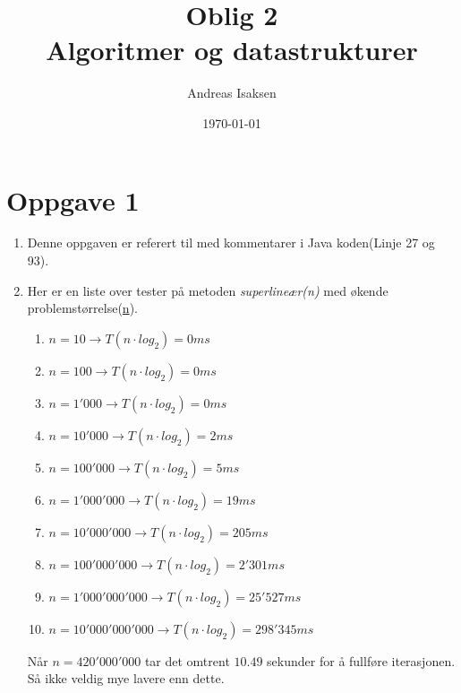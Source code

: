 \documentclass{article}
\begin{document}
  

\title{Oblig 2\\Algoritmer og datastrukturer}
\author{Andreas Isaksen}  
\date{\today}  
\maketitle  
\pagebreak

\section*{Oppgave 1}
\begin{enumerate}[label=\alph*)]
\item Denne oppgaven er referert til med kommentarer i Java koden(Linje 27 og 93).
\item Her er en liste over tester på metoden \textit{superlineær(n)} med økende problemstørrelse(\underline{n}).
\begin{enumerate}[label=-]
\item $n = 10 \to T(n\cdot log_2) = 0ms$
\item $n = 100 \to T(n\cdot log_2) = 0ms$
\item $n = 1'000 \to T(n\cdot log_2) = 0ms$
\item $n = 10'000 \to T(n\cdot log_2) = 2ms$
\item $n = 100'000 \to T(n\cdot log_2) = 5ms$
\item $n = 1'000'000 \to T(n\cdot log_2) = 19ms$
\item $n = 10'000'000 \to T(n\cdot log_2) = 205ms$
\item $n = 100'000'000 \to T(n\cdot log_2) = 2'301ms$
\item $n = 1'000'000'000 \to T(n\cdot log_2) = 25'527ms$
\item $n = 10'000'000'000 \to T(n\cdot log_2) = 298'345ms$
\end{enumerate}
Når $n = 420'000'000$ tar det omtrent $10.49$ sekunder for å fullføre iterasjonen. Så ikke veldig mye lavere enn dette.
\end{enumerate}
\end{document}
